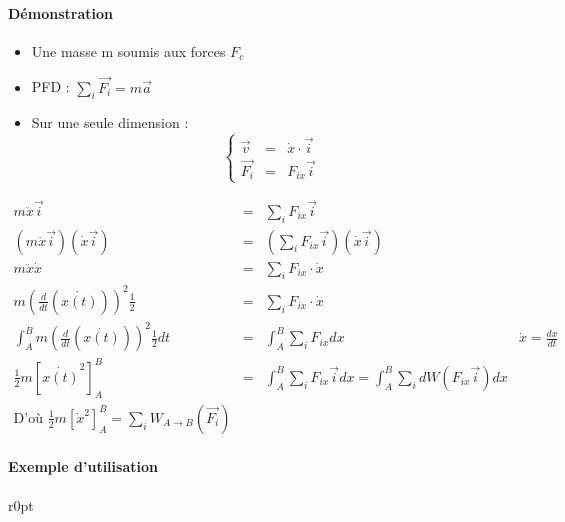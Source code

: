\paragraph{Démonstration}
	\begin{itemize}
		\item Une masse m soumis aux forces $F_c$
		\item PFD : $\sum_i \vec{F_i} = m\vec{a}$
		\item Sur une seule dimension : \[\left\{\begin{array}{rcl}
			\vec{v} &=& \dot{x} \cdot \vec{i} \\
						\vec{F_i} &=& F_{ix} \vec{i}
		\end{array}\right.\]
	\end{itemize}
		\[\begin{array}{rclr}
			m\ddot{x} \vec{i} &=& \sum_i F_{ix} \vec{i} \\
			(m\ddot{x}\vec{i})(\dot{x}\vec{i}) &=& (\sum_i F_{ix} \vec{i})(\dot{x}\vec{i}) \\
			m\ddot{x}\dot{x} &=& \sum_i F_{ix} \cdot \dot{x} \\
			m(\frac{d}{dt}(\dot{x(t)}))^2 \frac{1}{2} &=& \sum_i F_{ix} \cdot \dot{x} \\
			\int_A^B m(\frac{d}{dt}(\dot{x(t)}))^2 \frac{1}{2} dt &=& \int_A^B \sum_i F_{ix} dx & \dot{x} = \frac{dx}{dt} \\
				\frac{1}{2} m [\dot{x(t)}^2]_A^B &=& \int_A^B \sum_i F_{ix} \vec{i}dx = \int_A^B \sum_i dW(F_{ix}\vec{i}) dx \\
			\text{D'où } \frac{1}{2}m [\dot{x}^2]^B_A = \sum_i W_{A \to B} (\vec{F_i})
		\end{array}\]

\paragraph{Exemple d'utilisation}
	\begin{wrapfigure}[5]{r}{0pt}
	\end{wrapfigure}

